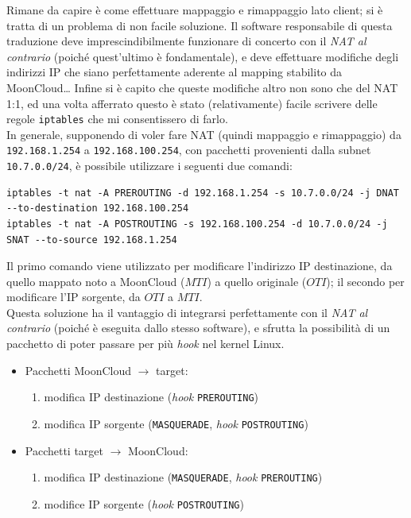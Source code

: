 Rimane da capire è come effettuare mappaggio e rimappaggio lato client;
si è tratta di un problema di non facile soluzione.
Il software responsabile di questa traduzione deve imprescindibilmente
funzionare di concerto con il \textit{NAT al contrario} (poiché quest'ultimo è
fondamentale), e deve effettuare
modifiche degli indirizzi IP che siano perfettamente aderente al mapping stabilito
da MoonCloud\ldots
Infine si è capito che queste modifiche altro non sono che del
NAT 1:1, ed una volta afferrato questo è stato (relativamente) facile scrivere delle
regole \texttt{iptables} che mi consentissero di farlo.\\
In generale, supponendo di voler fare NAT (quindi mappaggio e rimappaggio) da
\texttt{192.168.1.254} a \texttt{192.168.100.254},
con pacchetti provenienti dalla subnet \texttt{10.7.0.0/24}, è possibile
utilizzare i seguenti
due comandi:
\begin{verbatim}
iptables -t nat -A PREROUTING -d 192.168.1.254 -s 10.7.0.0/24 -j DNAT --to-destination 192.168.100.254
iptables -t nat -A POSTROUTING -s 192.168.100.254 -d 10.7.0.0/24 -j SNAT --to-source 192.168.1.254
\end{verbatim}
Il primo comando viene utilizzato per modificare l'indirizzo IP destinazione,
da quello mappato noto a MoonCloud ($MTI$) a quello originale ($OTI$); il secondo
per modificare l'IP sorgente, da $OTI$ a $MTI$.\\
Questa soluzione ha il vantaggio di integrarsi perfettamente con il \textit{NAT
al contrario} (poiché è eseguita dallo stesso software), e sfrutta la
possibilità di un pacchetto di poter passare per più \textit{hook}
nel kernel Linux.
\begin{itemize}
  \item Pacchetti MoonCloud $\rightarrow$ target:
  \begin{enumerate}
    \item modifica IP destinazione (\textit{hook} \texttt{PREROUTING})
    \item modifica IP sorgente (\texttt{MASQUERADE}, \textit{hook}
    \texttt{POSTROUTING})
  \end{enumerate}
  \item Pacchetti target $\rightarrow$ MoonCloud:
  \begin{enumerate}
    \item modifica IP destinazione (\texttt{MASQUERADE}, \textit{hook}
    \texttt{PREROUTING})
    \item modifice IP sorgente (\textit{hook} \texttt{POSTROUTING})
  \end{enumerate}
\end{itemize}

